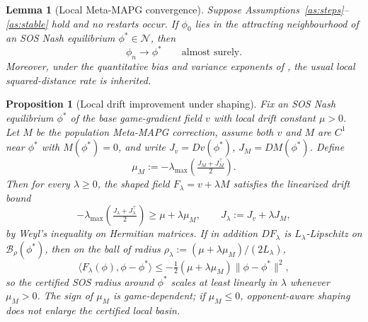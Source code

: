 \documentclass{article}
\theoremstyle{plain}
\newtheorem{lemma}[theorem]{Lemma}
\newtheorem{proposition}[theorem]{Proposition}
\theoremstyle{definition}
\theoremstyle{remark}
\newcommand{\B}{\mathcal{B}}
\newcommand{\N}{\mathcal{N}}
\begin{document}
\begin{lemma}[Local Meta-MAPG convergence]\label{lem:local}
Suppose Assumptions~\ref{as:steps}--\ref{as:stable} hold and no restarts occur. If $\phi_0$ lies in the attracting neighbourhood of an SOS Nash equilibrium $\phi^\ast\in\N$, then
\[
\phi_n\to\phi^\ast\qquad\text{almost surely.}
\]
Moreover, under the quantitative bias and variance exponents of \citet{giannou2022convergence}, the usual local squared-distance rate is inherited.
\end{lemma}

\begin{proposition}[Local drift improvement under shaping]\label{prop:basin}
Fix an SOS Nash equilibrium $\phi^\ast$ of the base game-gradient field $v$ with local drift constant $\mu>0$. Let $M$ be the population Meta-MAPG correction, assume both $v$ and $M$ are $C^1$ near $\phi^\ast$ with $M(\phi^\ast)=0$, and write $J_v=Dv(\phi^\ast)$, $J_M=DM(\phi^\ast)$. Define
\[
\mu_M:=-\lambda_{\max}\!\left(\tfrac{J_M+J_M^\top}{2}\right).
\]
Then for every $\lambda\ge 0$, the shaped field $F_\lambda=v+\lambda M$ satisfies the linearized drift bound
\begin{equation}\label{eq:weyl}
-\lambda_{\max}\!\left(\tfrac{J_\lambda+J_\lambda^\top}{2}\right)\ge \mu+\lambda\mu_M,
\qquad J_\lambda:=J_v+\lambda J_M,
\end{equation}
by Weyl's inequality on Hermitian matrices. If in addition $DF_\lambda$ is $L_\lambda$-Lipschitz on $\B_\rho(\phi^\ast)$, then on the ball of radius $\rho_\lambda:=(\mu+\lambda\mu_M)/(2L_\lambda)$,
\[
\langle F_\lambda(\phi),\phi-\phi^\ast\rangle\le -\tfrac{1}{2}(\mu+\lambda\mu_M)\|\phi-\phi^\ast\|^2,
\]
so the certified SOS radius around $\phi^\ast$ scales at least linearly in $\lambda$ whenever $\mu_M>0$. The sign of $\mu_M$ is game-dependent; if $\mu_M\le 0$, opponent-aware shaping does not enlarge the certified local basin.
\end{proposition}
\end{document}
